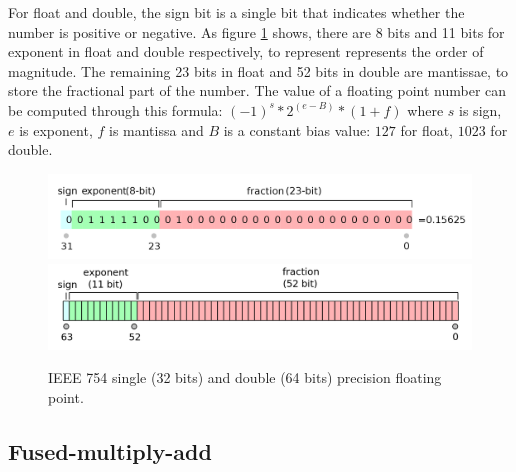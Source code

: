 \documentclass[logo,bsc,singlespacing,parskip]{infthesis}
\begin{document}
For float and double, the sign bit is a single bit that indicates whether the
number is positive or negative. As figure \ref{fig:ieee-f32} shows, there are 8
bits and 11 bits for exponent in float and double respectively, to represent
represents the order of magnitude. The remaining 23 bits in float and 52 bits in
double are mantissae, to store the fractional part of the number. The value of a
floating point number can be computed through this formula: 
\begin{math} (-1)^s * 2^{(e - B)} * (1 + f)\end{math}
where \begin{math}s\end{math} is sign, \begin{math}e\end{math} is exponent, 
\begin{math}f\end{math} is mantissa and \begin{math}B\end{math} is a constant bias
value: \begin{math}127\end{math} for float, \begin{math}1023\end{math} for double. 


\begin{figure}
    \includegraphics[width=\linewidth]{image/ieee-f32.png}
    \includegraphics[width=\linewidth]{image/ieee-f64.png}
    \caption{IEEE 754 single (32 bits) and double (64 bits) precision floating
    point. \cite{ieee754-diagram}}
    \label{fig:ieee-f32}
\end{figure}

\subsection{Fused-multiply-add}
\label{sec:FMA}
\end{document}
